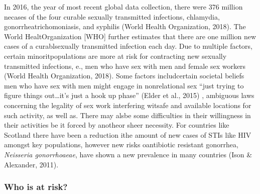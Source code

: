 \documentclass[
  english,
  donotrepeattitle,doc, 12pt, a4paper,floatsintext]{apa7}
\begin{document}
In 2016, the year of most recent global data collection, there were 376 million necases of the four curable sexually transmitted infections, chlamydia, gonorrheatrichomoniasis, and syphilis (World Health Organization, 2018). The World HealtOrganization {[}WHO{]} further estimates that there are one million new cases of a curablsexually transmitted infection each day. Due to multiple factors, certain minoritpopulations are more at risk for contracting new sexually transmitted infections, e., men who have sex with men and female sex workers (World Health Organization, 2018). Some factors includcertain societal beliefs men who have sex with men might engage in nonrelational sex ``just trying to figure things out\ldots it's just a hook up phase'' (Elder et al., 2015) , ambiguous laws concerning the legality of sex work interfering witsafe and available locations for such activity, as well as. There may alsbe some difficulties in their willingness in their activities be it forced by anotheor sheer necessity. For countries like Scotland there have been a reduction ithe amount of new cases of STIs like HIV amongst key populations, however new risks oantibiotic resistant gonorrhea, \emph{Neisseria gonorrhoaeae}, have shown a new prevalence in many countries (Ison \& Alexander, 2011).

\hypertarget{who-is-at-risk}{%
\subsubsection{Who is at risk?}\label{who-is-at-risk}}
\end{document}
